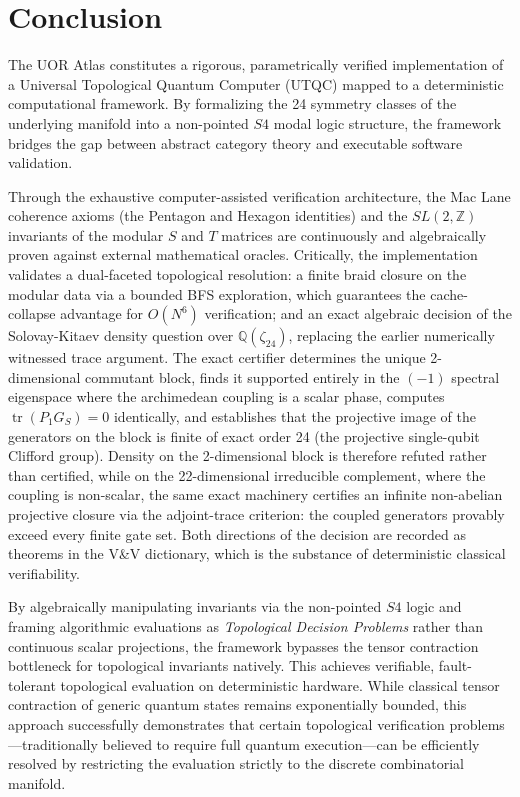 \section{Conclusion}

The UOR Atlas constitutes a rigorous, parametrically verified implementation of a Universal Topological Quantum Computer (UTQC) mapped to a deterministic computational framework. By formalizing the 24 symmetry classes of the underlying manifold into a non-pointed $S4$ modal logic structure, the framework bridges the gap between abstract category theory and executable software validation.

Through the exhaustive computer-assisted verification architecture, the Mac Lane coherence axioms (the Pentagon and Hexagon identities) and the $SL(2, \mathbb{Z})$ invariants of the modular $S$ and $T$ matrices are continuously and algebraically proven against external mathematical oracles. Critically, the implementation validates a dual-faceted topological resolution: a finite braid closure on the modular data via a bounded BFS exploration, which guarantees the cache-collapse advantage for $O(N^6)$ verification; and an exact algebraic decision of the Solovay-Kitaev density question over $\mathbb{Q}(\zeta_{24})$, replacing the earlier numerically witnessed trace argument. The exact certifier determines the unique 2-dimensional commutant block, finds it supported entirely in the $(-1)$ spectral eigenspace where the archimedean coupling is a scalar phase, computes $\operatorname{tr}(P_1 G_S) = 0$ identically, and establishes that the projective image of the generators on the block is finite of exact order 24 (the projective single-qubit Clifford group). Density on the 2-dimensional block is therefore refuted rather than certified, while on the 22-dimensional irreducible complement, where the coupling is non-scalar, the same exact machinery certifies an infinite non-abelian projective closure via the adjoint-trace criterion: the coupled generators provably exceed every finite gate set. Both directions of the decision are recorded as theorems in the V\&V dictionary, which is the substance of deterministic classical verifiability.

By algebraically manipulating invariants via the non-pointed $S4$ logic and framing algorithmic evaluations as \textit{Topological Decision Problems} rather than continuous scalar projections, the framework bypasses the tensor contraction bottleneck for topological invariants natively. This achieves verifiable, fault-tolerant topological evaluation on deterministic hardware. While classical tensor contraction of generic quantum states remains exponentially bounded, this approach successfully demonstrates that certain topological verification problems—traditionally believed to require full quantum execution—can be efficiently resolved by restricting the evaluation strictly to the discrete combinatorial manifold.

